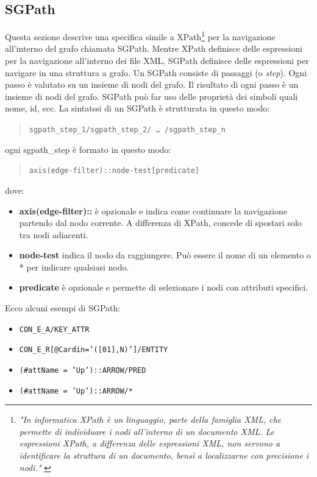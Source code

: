         \subsection{SGPath}
            Questa sezione descrive una specifica simile a XPath\footnote{\textit{"In informatica XPath è un linguaggio, parte della famiglia XML, che permette di individuare i nodi all'interno di un documento XML. Le espressioni XPath, a differenza delle espressioni XML, non servono a identificare la struttura di un documento, bensì a localizzarne con precisione i nodi."} \cite{xpath}} per la navigazione all'interno del grafo chiamata SGPath. Mentre XPath definisce delle espressioni per la navigazione all'interno dei file XML, SGPath definisce delle espressioni per navigare in una struttura a grafo.
            \newline
            Un SGPath consiste di passaggi (o \textit{step}). Ogni passo è valutato su un insieme di nodi del grafo. Il risultato di ogni passo è un insieme di nodi del grafo. SGPath può far uso delle proprietà dei simboli quali nome, id, ecc.
            \newline
            La sintatssi di un SGPath è strutturata in questo modo:
            \begin{quotation}
                \texttt{sgpath\_step\_1/sgpath\_step\_2/ … /sgpath\_step\_n}
            \end{quotation}
            ogni sgpath\_step è formato in questo modo:
            \begin{quotation}
                \texttt{axis(edge-filter)::node-test[predicate]}
            \end{quotation}
            dove:
            \begin{itemize}
                \item \textbf{axis(edge-filter)::} è opzionale e indica come continuare la navigazione partendo dal nodo corrente. A differenza di XPath, concede di spostari solo tra nodi adiacenti.
                \item \textbf{node-test} indica il nodo da raggiungere. Può essere il nome di un elemento o * per indicare qualsiasi nodo.
                \item \textbf{\lbrack predicate\rbrack} è opzionale e permette di selezionare i nodi con attributi specifici.
            \end{itemize}
            Ecco alcuni esempi di SGPath:
            \begin{itemize}
                \item \texttt{CON\_E\_A/KEY\_ATTR}
                \item \texttt{CON\_E\_R[@Cardin='([01],N)']/ENTITY}
                \item \texttt{(\#attName = 'Up')::ARROW/PRED}
                \item \texttt{(\#attName = 'Up')::ARROW/*}
            \end{itemize}
